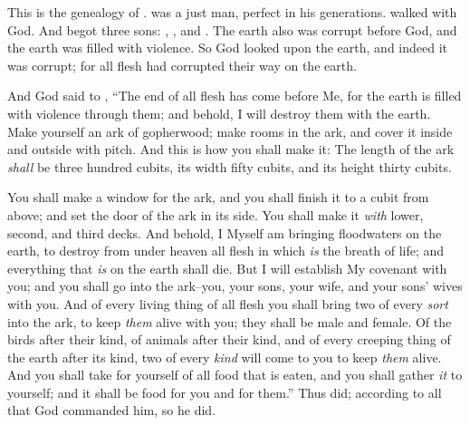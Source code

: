 
\bverse This is the genealogy of .  was a just man, perfect in his generations.  walked with God.
\bverse And  begot three sons: , , and .
\bverse The earth also was corrupt before God, and the earth was filled with violence.
\bverse So God looked upon the earth, and indeed it was corrupt; for all flesh had corrupted their way on the earth.


\bverse And God said to , ``The end of all flesh has come before Me, for the earth is filled with violence through them; and behold, I will destroy them with the earth.
\bverse Make yourself an ark of gopherwood; make rooms in the ark, and cover it inside and outside with pitch.
\bverse And this is how you shall make it: The length of the ark \textit{shall} be three hundred cubits, its width fifty cubits, and its height thirty cubits.

\bverse You shall make a window for the ark, and you shall finish it to a cubit from above; and set the door of the ark in its side. You shall make it \textit{with} lower, second, and third decks.
\bverse And behold, I Myself am bringing floodwaters on the earth, to destroy from under heaven all flesh in which \textit{is} the breath of life; and everything that \textit{is} on the earth shall die.
\bverse But I will establish My covenant with you; and you shall go into the ark--you, your sons, your wife, and your sons' wives with you.
\bverse And of every living thing of all flesh you shall bring two of every \textit{sort} into the ark, to keep \textit{them} alive with you; they shall be male and female.
\bverse Of the birds after their kind, of animals after their kind, and of every creeping thing of the earth after its kind, two of every \textit{kind} will come to you to keep \textit{them} alive.
\bverse And you shall take for yourself of all food that is eaten, and you shall gather \textit{it} to yourself; and it shall be food for you and for them.''
\bverse Thus  did; according to all that God commanded him, so he did.
